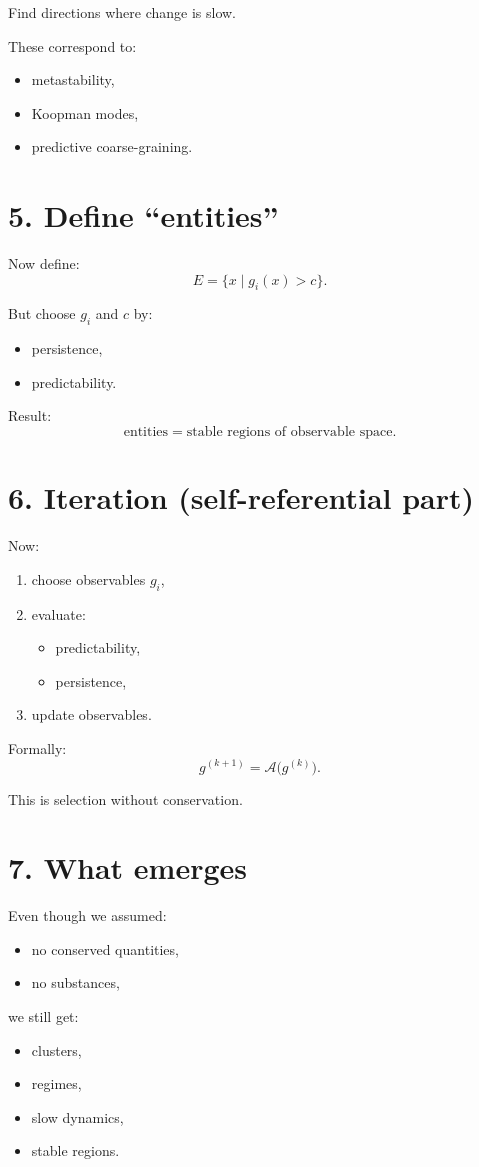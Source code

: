 \documentclass[11pt]{article}
\begin{document}
Find directions where change is slow.

These correspond to:
\begin{itemize}[leftmargin=2em]
    \item metastability,
    \item Koopman modes,
    \item predictive coarse-graining.
\end{itemize}

\section*{5. Define ``entities''}

Now define:
\[
E = \{x \mid g_i(x) > c\}.
\]

But choose \(g_i\) and \(c\) by:
\begin{itemize}[leftmargin=2em]
    \item persistence,
    \item predictability.
\end{itemize}

Result:
\[
\text{entities} = \text{stable regions of observable space}.
\]

\section*{6. Iteration (self-referential part)}

Now:
\begin{enumerate}[leftmargin=2em]
    \item choose observables \(g_i\),
    \item evaluate:
    \begin{itemize}
        \item predictability,
        \item persistence,
    \end{itemize}
    \item update observables.
\end{enumerate}

Formally:
\[
g^{(k+1)} = \mathcal{A}\bigl(g^{(k)}\bigr).
\]

This is selection without conservation.

\section*{7. What emerges}

Even though we assumed:
\begin{itemize}[leftmargin=2em]
    \item no conserved quantities,
    \item no substances,
\end{itemize}
we still get:
\begin{itemize}[leftmargin=2em]
    \item clusters,
    \item regimes,
    \item slow dynamics,
    \item stable regions.
\end{itemize}
\end{document}
